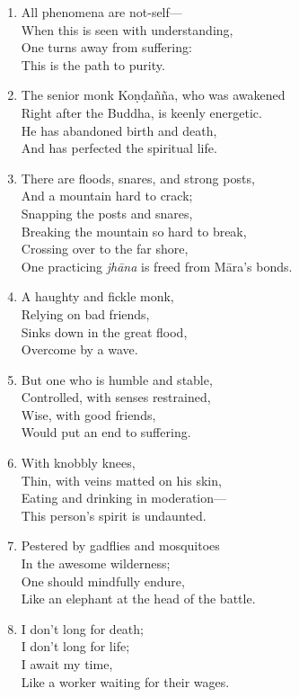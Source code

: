 \documentclass[10pt, openany]{book}
\begin{document}
\begin{enumerate}
\item All phenomena are not-self—\\
When this is seen with understanding,\\
One turns away from suffering:\\
This is the path to purity.

\item The senior monk Koṇḍañña, who was awakened\\
Right after the Buddha, is keenly energetic.\\
He has abandoned birth and death,\\
And has perfected the spiritual life.

\item There are floods, snares, and strong posts,\\
And a mountain hard to crack;\\
Snapping the posts and snares,\\
Breaking the mountain so hard to break,\\
Crossing over to the far shore,\\
One practicing \emph{jhāna} is freed from Māra’s bonds.

\item A haughty and fickle monk,\\
Relying on bad friends,\\
Sinks down in the great flood,\\
Overcome by a wave.

\item But one who is humble and stable,\\
Controlled, with senses restrained,\\
Wise, with good friends,\\
Would put an end to suffering.

\item With knobbly knees,\\
Thin, with veins matted on his skin,\\
Eating and drinking in moderation—\\
This person’s spirit is undaunted.

\item Pestered by gadflies and mosquitoes\\
In the awesome wilderness;\\
One should mindfully endure,\\
Like an elephant at the head of the battle.

\item I don’t long for death;\\
I don’t long for life;\\
I await my time,\\
Like a worker waiting for their wages.


\end{enumerate}
\end{document}
